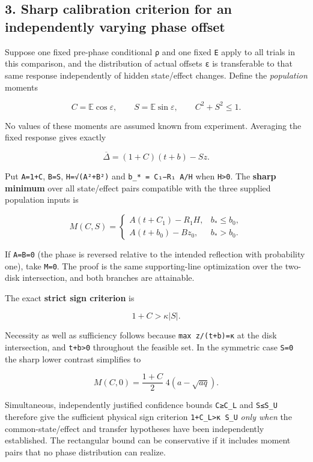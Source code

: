 \documentclass[
  10pt,
  a4paper,
]{article}
\begin{document}
\subsection{3. Sharp calibration criterion for an independently varying phase offset}\label{sharp-calibration-criterion-for-an-independently-varying-phase-offset}

Suppose one fixed pre-phase conditional \texttt{ρ} and one fixed \texttt{E} apply to all trials in this comparison, and the distribution of actual offsets \texttt{ε} is transferable to that same response independently of hidden state/effect changes. Define the \emph{population} moments

\[
 C=\mathbb E\cos\varepsilon,\qquad S=\mathbb E\sin\varepsilon,
\qquad C^2+S^2\le1.
\]

No values of these moments are assumed known from experiment. Averaging the fixed response gives exactly

\[
 \overline\Delta=(1+C)(t+b)-S z.
\]

Put \texttt{A=1+C}, \texttt{B=\textbar{}S\textbar{}}, \texttt{H=√(A²+B²)} and \texttt{b\_*\ =\ C₁−R₁\ A/H} when \texttt{H\textgreater{}0}. The \textbf{sharp minimum} over all state/effect pairs compatible with the three supplied population inputs is

\[
 \boxed{\displaystyle
 M(C,S)=\begin{cases}
 A(t+C_1)-R_1H, & b_*\le b_0,\\
 A(t+b_0)-Bz_0, & b_*>b_0.
 \end{cases}}
\]

If \texttt{A=B=0} (the phase is reversed relative to the intended reflection with probability one), take \texttt{M=0}. The proof is the same supporting-line optimization over the two-disk intersection, and both branches are attainable.

The exact \textbf{strict sign criterion} is

\[
 \boxed{1+C>\kappa|S|.}
\]

Necessity as well as sufficiency follows because \texttt{max\ z/(t+b)=κ} at the disk intersection, and \texttt{t+b\textgreater{}0} throughout the feasible set. In the symmetric case \texttt{S=0} the sharp lower contrast simplifies to

\[
 \boxed{M(C,0)=\frac{1+C}{2}\;4(a-\sqrt{aq}).}
\]

Simultaneous, independently justified confidence bounds \texttt{C≥C\_L} and \texttt{\textbar{}S\textbar{}≤S\_U} therefore give the sufficient physical sign criterion \texttt{1+C\_L\textgreater{}κ\ S\_U} \emph{only when} the common-state/effect and transfer hypotheses have been independently established. The rectangular bound can be conservative if it includes moment pairs that no phase distribution can realize.
\end{document}
